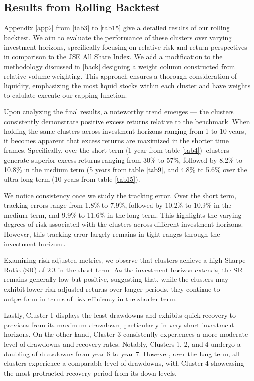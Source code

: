 \documentclass[11pt,preprint, authoryear]{elsarticle}
\numberwithin{equation}{section}
\numberwithin{figure}{section}
\numberwithin{table}{section}
\begin{document}
\hypertarget{results-from-rolling-backtest}{%
\subsection{Results from Rolling
Backtest}\label{results-from-rolling-backtest}}

Appendix \ref{app2} from \ref{tab3} to \ref{tab15} give a detailed
results of our rolling backtest. We aim to evaluate the performance of
these clusters over varying investment horizons, specifically focusing
on relative risk and return perspectives in comparison to the JSE All
Share Index. We add a modification to the methodology discussed in
\ref{back} designing a weight column constructed from relative volume
weighting. This approach ensures a thorough consideration of liquidity,
emphasizing the most liquid stocks within each cluster and have weights
to calulate execute our capping function.

Upon analyzing the final results, a noteworthy trend emerges --- the
clusters consistently demonstrate positive excess returns relative to
the benchmark. When holding the same clusters across investment horizons
ranging from 1 to 10 years, it becomes apparent that excess returns are
maximized in the shorter time frames. Specifically, over the short-term
(1 year from table \ref{tab4}), clusters generate superior excess
returns ranging from 30\% to 57\%, followed by 8.2\% to 10.8\% in the
medium term (5 years from table \ref{tab9}, and 4.8\% to 5.6\% over the
ultra-long term (10 years from table \ref{tab15}).

We notice consistency once we study the tracking error. Over the short
term, tracking errors range from 1.8\% to 7.9\%, followed by 10.2\% to
10.9\% in the medium term, and 9.9\% to 11.6\% in the long term. This
highlights the varying degrees of risk associated with the clusters
across different investment horizons. However, this tracking error
largely remains in tight ranges through the investment horizons.

Examining risk-adjusted metrics, we observe that clusters achieve a high
Sharpe Ratio (SR) of 2.3 in the short term. As the investment horizon
extends, the SR remains generally low but positive, suggesting that,
while the clusters may exhibit lower risk-adjusted returns over longer
periods, they continue to outperform in terms of risk efficiency in the
shorter term.

Lastly, Cluster 1 displays the least drawdowns and exhibits quick
recovery to previous from its maximum drawdown, particularly in very
short investment horizons. On the other hand, Cluster 3 consistently
experiences a more moderate level of drawdowns and recovery rates.
Notably, Clusters 1, 2, and 4 undergo a doubling of drawdowns from year
6 to year 7. However, over the long term, all clusters experience a
comparable level of drawdowns, with Cluster 4 showcasing the most
protracted recovery period from its down levels.
\end{document}
